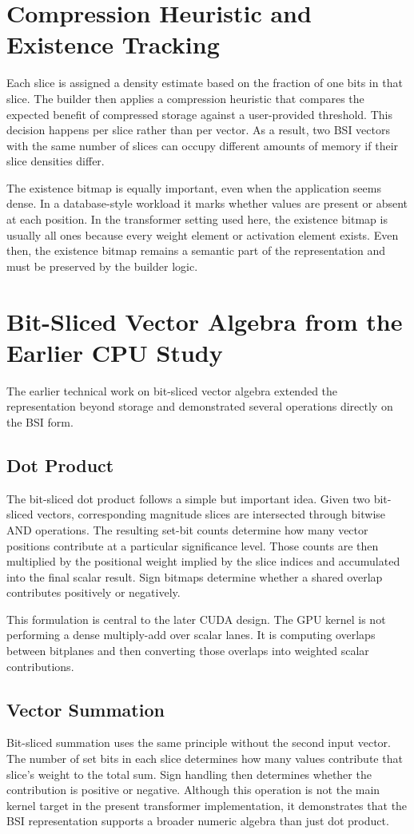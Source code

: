 \section{Compression Heuristic and Existence Tracking}
Each slice is assigned a density estimate based on the fraction of one bits in that slice. The builder then applies a compression heuristic that compares the expected benefit of compressed storage against a user-provided threshold. This decision happens per slice rather than per vector. As a result, two BSI vectors with the same number of slices can occupy different amounts of memory if their slice densities differ.

The existence bitmap is equally important, even when the application seems dense. In a database-style workload it marks whether values are present or absent at each position. In the transformer setting used here, the existence bitmap is usually all ones because every weight element or activation element exists. Even then, the existence bitmap remains a semantic part of the representation and must be preserved by the builder logic.

\section{Bit-Sliced Vector Algebra from the Earlier CPU Study}
The earlier technical work on bit-sliced vector algebra extended the representation beyond storage and demonstrated several operations directly on the BSI form.

\subsection{Dot Product}
The bit-sliced dot product follows a simple but important idea. Given two bit-sliced vectors, corresponding magnitude slices are intersected through bitwise AND operations. The resulting set-bit counts determine how many vector positions contribute at a particular significance level. Those counts are then multiplied by the positional weight implied by the slice indices and accumulated into the final scalar result. Sign bitmaps determine whether a shared overlap contributes positively or negatively.

This formulation is central to the later CUDA design. The GPU kernel is not performing a dense multiply-add over scalar lanes. It is computing overlaps between bitplanes and then converting those overlaps into weighted scalar contributions.

\subsection{Vector Summation}
Bit-sliced summation uses the same principle without the second input vector. The number of set bits in each slice determines how many values contribute that slice's weight to the total sum. Sign handling then determines whether the contribution is positive or negative. Although this operation is not the main kernel target in the present transformer implementation, it demonstrates that the BSI representation supports a broader numeric algebra than just dot product.


